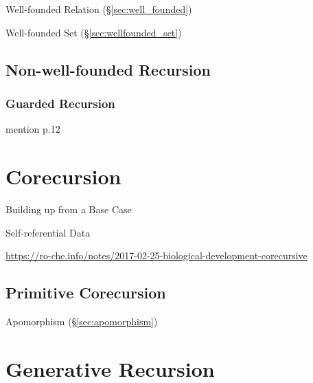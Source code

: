 Well-founded Relation (\S\ref{sec:well_founded})

Well-founded Set (\S\ref{sec:wellfounded_set})



\subsection{Non-well-founded Recursion}
\label{sec:nonwellfounded_recursion}

\subsubsection{Guarded Recursion}\label{sec:guarded_recursion}

mention \cite{abramsky-gay-nagarajan96} p.12

\cite{atkey-mcbride13}



\section{Corecursion}\label{sec:corecursion}

Building up from a Base Case

Self-referential Data

\url{https://ro-che.info/notes/2017-02-25-biological-development-corecursive}



\subsection{Primitive Corecursion}\label{sec:primitive_corecursion}

Apomorphism (\S\ref{sec:apomorphism})



\section{Generative Recursion}\label{sec:generative_recursion}

